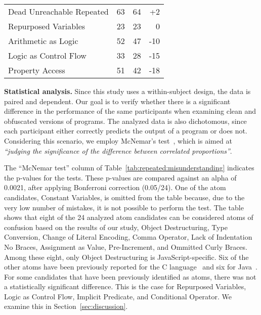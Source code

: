 \begin{table}[t!]
{\begin{scriptsize}
\begin{tabular}{lrrr}
Dead Unreachable Repeated &           63 &      64 &                  +2 \\
Repurposed Variables      &           23 &      23 &                   0 \\
Arithmetic as Logic       &           52 &      47 &                 -10 \\
Logic as Control Flow     &           33 &      28 &                 -15 \\
Property Access           &           51 &      42 &                 -18 \\
\bottomrule  
\end{tabular}
\end{scriptsize}
}
\end{table}


{\bf Statistical analysis.}
Since this study uses a within-subject design, the data is paired and dependent. Our goal is to verify whether there is a significant difference in the performance of the same participants when examining clean and obfuscated versions of programs. The analyzed data is also dichotomous, since each participant either correctly predicts the output of a program or does not. Considering this scenario, we employ McNemar's test~\cite{McNemar:1947:NSE}, which is aimed at \textit{``judging the significance of the difference between correlated proportions''}.

The ``McNemar test'' column of Table~\ref{tab:repeated:misunderstanding} indicates the p-values for the tests. These p-values are compared against an alpha of 0.0021, after applying Bonferroni correction (0.05/24). One of the atom candidates, Constant Variables, is omitted from the table because, due to the very low number of mistakes, it is not possible to perform the test. The table shows that eight of the 24 analyzed atom candidates can be considered atoms of confusion based on the results of our study, Object Destructuring, Type Conversion, Change of Literal Encoding, Comma Operator, Lack of Indentation No Braces, Assignment as Value, Pre-Increment, and Ommitted Curly Braces. Among these eight, only Object Destructuring is JavaScript-specific. Six of the other atoms have been previously reported for the C language~\cite{DBLP:conf/sigsoft/GopsteinIYDZYC17} and six for Java~\cite{Langhout:2021:ACJ}.
For some candidates that have been previously identified as atoms, there was not a statistically significant difference. This is the case for Repurposed Variables, Logic as Control Flow, Implicit Predicate, and Conditional Operator. We examine this in Section~\ref{sec:discussion}.

